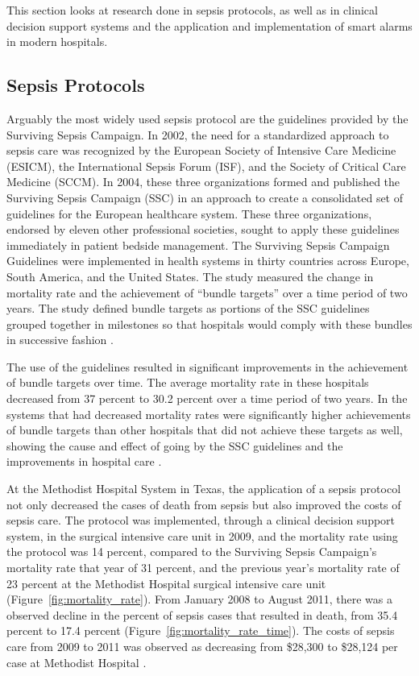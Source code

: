 \documentclass{sig-alternate}
\begin{document}
This section looks at research done in sepsis protocols, as well as in clinical decision support systems and the application and implementation of smart alarms in modern hospitals.

\vspace{10pt}
\subsection{Sepsis Protocols}
\label{subsec:protocols}
\vspace{10pt}

Arguably the most widely used sepsis protocol are the guidelines provided by the Surviving Sepsis Campaign. In 2002, the need for a standardized approach to sepsis care was recognized by the European Society of Intensive Care Medicine (ESICM), the International Sepsis Forum (ISF), and the Society of Critical Care Medicine (SCCM). In 2004, these three organizations formed and published the Surviving Sepsis Campaign (SSC) in an approach to create a consolidated set of guidelines for the European healthcare system. These three organizations, endorsed by eleven other professional societies, sought to apply these guidelines immediately in patient bedside management. The Surviving Sepsis Campaign Guidelines were implemented in health systems in thirty countries across Europe, South America, and the United States. The study measured the change in mortality rate and the achievement of ``bundle targets'' over a time period of two years. The study defined bundle targets as portions of the SSC guidelines grouped together in milestones so that hospitals would comply with these bundles in successive fashion \cite{ssc}. 

The use of the guidelines resulted in significant improvements in the achievement of bundle targets over time. The average mortality rate in these hospitals decreased from 37 percent to 30.2 percent over a time period of two years. In the systems that had decreased mortality rates were significantly higher achievements of bundle targets than other hospitals that did not achieve these targets as well, showing the cause and effect of going by the SSC guidelines and the improvements in hospital care \cite{ssc}.

At the Methodist Hospital System in Texas, the application of a sepsis protocol not only decreased the cases of death from sepsis but also improved the costs of sepsis care. The protocol was implemented, through a clinical decision support system, in the surgical intensive care unit in 2009, and the mortality rate using the protocol was 14 percent, compared to the Surviving Sepsis Campaign's mortality rate that year of 31 percent, and the previous year's mortality rate of 23 percent at the Methodist Hospital surgical intensive care unit (Figure~\ref{fig:mortality_rate}). From January 2008 to August 2011, there was a observed decline in the percent of sepsis cases that resulted in death, from 35.4 percent to 17.4 percent (Figure~\ref{fig:mortality_rate_time}). The costs of sepsis care from 2009 to 2011 was observed as decreasing from \$28,300 to \$28,124 per case at Methodist Hospital \cite{methodist}.
\end{document}
